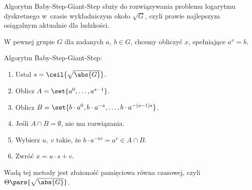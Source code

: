 Algorytm Baby-Step-Giant-Step służy do rozwiązywania problemu logarytmu dyskretnego w~czasie wykładniczym około \( \sqrt{G} \), czyli prawie najlepszym osiągalnym aktualnie dla ludzkości.

W pewnej grupie \( G \) dla zadanych \(a, \ b \in G \), chcemy obliczyć \( x \), spełniające \( a^x = b \).
\begin{greyframe}
	Algorytm Baby-Step-Giant-Step:
	\begin{enumerate}
		\item Ustal \( s = \ceil{\sqrt{\abs{G}}} \).
		\item Oblicz \( A = \set{a^0, \dots, a^{s-1}} \).
		\item Oblicz \( B = \set{b \cdot a^0, b \cdot a^{-s}, \dots,  b \cdot a^{-(s-1)s}} \).
		\item Jeśli \( A \cap B = \emptyset \), nie ma rozwiązania.
		\item Wybierz \( u, \ v \) takie, że \( b \cdot a^{-us} = a^v \in A \cap B \). \item Zwróć \( x = u \cdot s + v \).
	\end{enumerate}
\end{greyframe}

Wadą tej metody jest złożoność pamięciowa równa czasowej, czyli \( \Theta\pars{\sqrt{\abs{G}}} \).